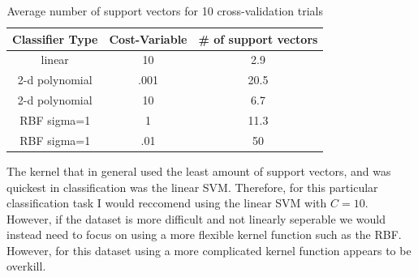 \documentclass[paper=a4, fontsize=11pt]{scrartcl} %
\begin{document}
\begin{table}
\centering
\label{tab:nsv}
\caption{Average number of support vectors for 10 cross-validation trials}
\begin{tabular}{|c|c|c|}
\hline
Classifier Type & Cost-Variable & \# of support vectors \\ \hline \hline
linear & 10 & 2.9 \\ \hline
2-d polynomial & .001 & 20.5 \\ \hline
2-d polynomial & 10 & 6.7 \\ \hline
RBF sigma=1 & 1 & 11.3 \\ \hline
RBF sigma=1 & .01 & 50 \\ \hline
\end{tabular}
\end{table}

The kernel that in general used the least amount of support vectors, and was quickest in classification was the linear SVM.
Therefore, for this particular classification task I would reccomend using the linear SVM with $C=10$.
However, if the dataset is more difficult and not linearly seperable we would instead need to focus on using a more flexible kernel function such as the RBF.  
However, for this dataset using a more complicated kernel function appears to be overkill.
\end{document}
